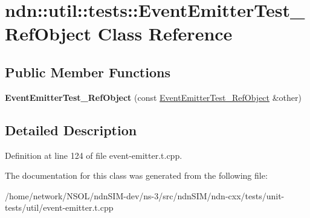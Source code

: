 \hypertarget{classndn_1_1util_1_1tests_1_1EventEmitterTest__RefObject}{}\section{ndn\+:\+:util\+:\+:tests\+:\+:Event\+Emitter\+Test\+\_\+\+Ref\+Object Class Reference}
\label{classndn_1_1util_1_1tests_1_1EventEmitterTest__RefObject}
\subsection*{Public Member Functions}
\begin{DoxyCompactItemize}
\item 
{\bfseries Event\+Emitter\+Test\+\_\+\+Ref\+Object} (const \hyperlink{classndn_1_1util_1_1tests_1_1EventEmitterTest__RefObject}{Event\+Emitter\+Test\+\_\+\+Ref\+Object} \&other)\hypertarget{classndn_1_1util_1_1tests_1_1EventEmitterTest__RefObject_a95a73daa85e28c8e382da4146c087302}{}\label{classndn_1_1util_1_1tests_1_1EventEmitterTest__RefObject_a95a73daa85e28c8e382da4146c087302}

\end{DoxyCompactItemize}


\subsection{Detailed Description}


Definition at line 124 of file event-\/emitter.\+t.\+cpp.



The documentation for this class was generated from the following file\+:\begin{DoxyCompactItemize}
\item 
/home/network/\+N\+S\+O\+L/ndn\+S\+I\+M-\/dev/ns-\/3/src/ndn\+S\+I\+M/ndn-\/cxx/tests/unit-\/tests/util/event-\/emitter.\+t.\+cpp\end{DoxyCompactItemize}
